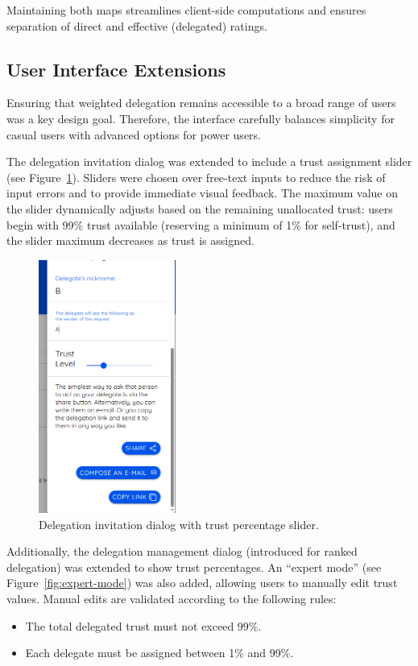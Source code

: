 Maintaining both maps streamlines client-side computations and ensures separation of direct and effective (delegated) ratings.

\subsection{User Interface Extensions}

Ensuring that weighted delegation remains accessible to a broad range of users was a key design goal. Therefore, the interface carefully balances simplicity for casual users with advanced options for power users.

The delegation invitation dialog was extended to include a trust assignment slider (see Figure~\ref{fig:trust-slider}). Sliders were chosen over free-text inputs to reduce the risk of input errors and to provide immediate visual feedback. The maximum value on the slider dynamically adjusts based on the remaining unallocated trust: users begin with 99\% trust available (reserving a minimum of 1\% for self-trust), and the slider maximum decreases as trust is assigned.

\begin{figure}[H]
    \centering
    \includegraphics[width=0.4\textwidth]{../common/weighted_sc/inv.png}
    \caption{Delegation invitation dialog with trust percentage slider.}
    \label{fig:trust-slider}
\end{figure}

Additionally, the delegation management dialog (introduced for ranked delegation) was extended to show trust percentages. An ``expert mode'' (see Figure~\ref{fig:expert-mode}) was also added, allowing users to manually edit trust values. Manual edits are validated according to the following rules:
\begin{itemize}
    \item The total delegated trust must not exceed 99\%.
    \item Each delegate must be assigned between 1\% and 99\%.
\end{itemize}

